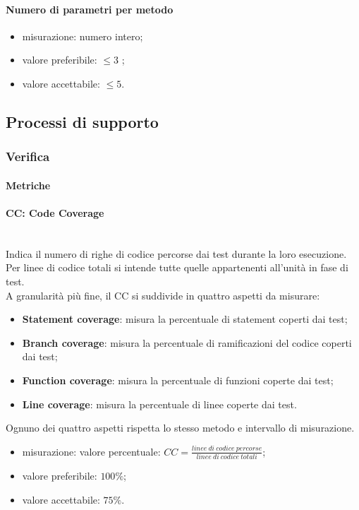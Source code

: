 		
			\paragraph*{Numero di parametri per metodo}
			\begin{itemize}
				\item misurazione: numero intero;
				\item valore preferibile: $ \leq 3$ ;
				\item valore accettabile: $ \leq 5$.
			\end{itemize}
			
\subsection{Processi di supporto}
	\subsubsection{Verifica}
		\paragraph{Metriche}
			\paragraph*{CC: Code Coverage}\mbox{}\\
				Indica il numero di righe di codice percorse dai test durante la loro esecuzione. Per linee di codice totali si intende tutte quelle appartenenti all'unità in fase di test.\\
				A granularità più fine, il CC si suddivide in quattro aspetti da misurare:
				\begin{itemize}
					\item \textbf{Statement coverage}: misura la percentuale di statement coperti dai test;
					\item \textbf{Branch coverage}: misura la percentuale di ramificazioni del codice coperti dai test;
					\item \textbf{Function coverage}: misura la percentuale di funzioni coperte dai test;
					\item \textbf{Line coverage}: misura la percentuale di linee coperte dai test.
				\end{itemize}
				Ognuno dei quattro aspetti rispetta lo stesso metodo e intervallo di misurazione.
				\begin{itemize}
					\item misurazione: valore percentuale: $CC = \frac{linee\ di\ codice\ percorse}{linee\ di\ codice\ totali}$;
					\item valore preferibile: $100\%$;
					\item valore accettabile: $75\%$.
				\end{itemize}

